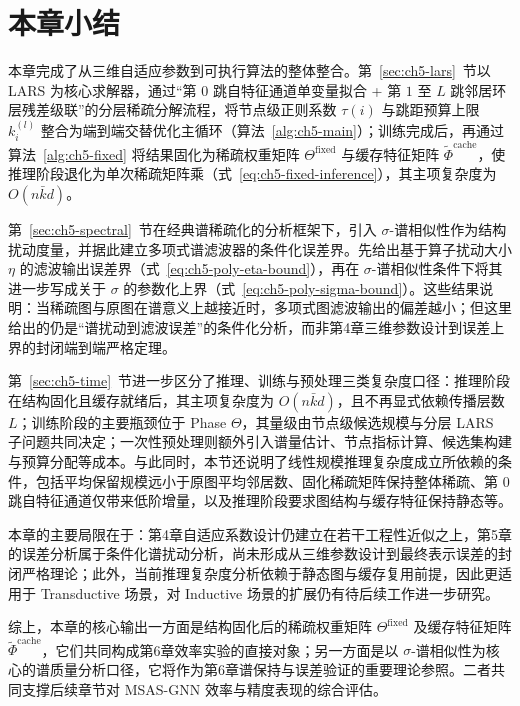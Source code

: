 \section{本章小结}
\label{sec:ch5-summary}

本章完成了从三维自适应参数到可执行算法的整体整合。第~\ref{sec:ch5-lars}~节以 LARS 为核心求解器，通过“第 $0$ 跳自特征通道单变量拟合 + 第 $1$ 至 $L$ 跳邻居环层残差级联”的分层稀疏分解流程，将节点级正则系数 $\tau(i)$ 与跳距预算上限 $k_i^{(l)}$ 整合为端到端交替优化主循环（算法~\ref{alg:ch5-main}）；训练完成后，再通过算法~\ref{alg:ch5-fixed} 将结果固化为稀疏权重矩阵 $\Theta^{\text{fixed}}$ 与缓存特征矩阵 $\tilde{\Phi}^{\text{cache}}$，使推理阶段退化为单次稀疏矩阵乘（式~\eqref{eq:ch5-fixed-inference}），其主项复杂度为 $O(n\bar{k}d)$。

第~\ref{sec:ch5-spectral}~节在经典谱稀疏化的分析框架下，引入 $\sigma$-谱相似性作为结构扰动度量，并据此建立多项式谱滤波器的条件化误差界。先给出基于算子扰动大小 $\eta$ 的滤波输出误差界（式~\eqref{eq:ch5-poly-eta-bound}），再在 $\sigma$-谱相似性条件下将其进一步写成关于 $\sigma$ 的参数化上界（式~\eqref{eq:ch5-poly-sigma-bound}）。这些结果说明：当稀疏图与原图在谱意义上越接近时，多项式图滤波输出的偏差越小；但这里给出的仍是“谱扰动到滤波误差”的条件化分析，而非第4章三维参数设计到误差上界的封闭端到端严格定理。

第~\ref{sec:ch5-time}~节进一步区分了推理、训练与预处理三类复杂度口径：推理阶段在结构固化且缓存就绪后，其主项复杂度为 $O(n\bar{k}d)$，且不再显式依赖传播层数 $L$；训练阶段的主要瓶颈位于 Phase $\Theta$，其量级由节点级候选规模与分层 LARS 子问题共同决定；一次性预处理则额外引入谱量估计、节点指标计算、候选集构建与预算分配等成本。与此同时，本节还说明了线性规模推理复杂度成立所依赖的条件，包括平均保留规模远小于原图平均邻居数、固化稀疏矩阵保持整体稀疏、第 $0$ 跳自特征通道仅带来低阶增量，以及推理阶段要求图结构与缓存特征保持静态等。

本章的主要局限在于：第4章自适应系数设计仍建立在若干工程性近似之上，第5章的误差分析属于条件化谱扰动分析，尚未形成从三维参数设计到最终表示误差的封闭严格理论；此外，当前推理复杂度分析依赖于静态图与缓存复用前提，因此更适用于 Transductive 场景，对 Inductive 场景的扩展仍有待后续工作进一步研究。

综上，本章的核心输出一方面是结构固化后的稀疏权重矩阵 $\Theta^{\text{fixed}}$ 及缓存特征矩阵 $\tilde{\Phi}^{\text{cache}}$，它们共同构成第6章效率实验的直接对象；另一方面是以 $\sigma$-谱相似性为核心的谱质量分析口径，它将作为第6章谱保持与误差验证的重要理论参照。二者共同支撑后续章节对 MSAS-GNN 效率与精度表现的综合评估。

